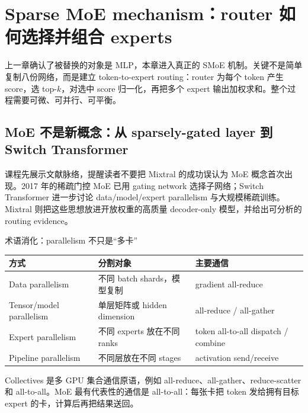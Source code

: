 \section{Sparse MoE mechanism：router 如何选择并组合 experts}

上一章确认了被替换的对象是 MLP，本章进入真正的 SMoE 机制。关键不是简单复制八份网络，而是建立 token-to-expert routing：router 为每个 token 产生 score，选 top-$k$，对选中 score 归一化，再把多个 expert 输出加权求和。整个过程需要可微、可并行、可平衡。

\subsection{MoE 不是新概念：从 sparsely-gated layer 到 Switch Transformer}

课程先展示文献脉络，提醒读者不要把 Mixtral 的成功误认为 MoE 概念首次出现。2017 年的稀疏门控 MoE 已用 gating network 选择子网络；Switch Transformer 进一步讨论 data/model/expert parallelism 与大规模稀疏训练。Mixtral 则把这些思想放进开放权重的高质量 decoder-only 模型，并给出可分析的 routing evidence。



\begin{knowledgebox}{术语消化：parallelism 不只是“多卡”}
\begin{tabularx}{\textwidth}{L{0.19\textwidth} L{0.27\textwidth} X}
\toprule
方式 & 分割对象 & 主要通信 \\
\midrule
Data parallelism & 不同 batch shards，模型复制 & gradient all-reduce \\
Tensor/model parallelism & 单层矩阵或 hidden dimension & all-reduce / all-gather \\
Expert parallelism & 不同 experts 放在不同 ranks & token all-to-all dispatch / combine \\
Pipeline parallelism & 不同层放在不同 stages & activation send/receive \\
\bottomrule
\end{tabularx}
Collectives 是多 GPU 集合通信原语，例如 all-reduce、all-gather、reduce-scatter 和 all-to-all。MoE 最有代表性的通信是 all-to-all：每张卡把 token 发给拥有目标 expert 的卡，计算后再把结果送回。
\end{knowledgebox}

